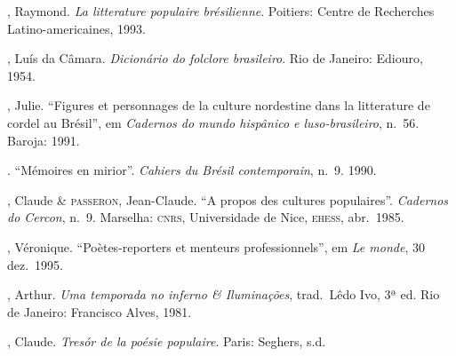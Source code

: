 \begin{bibliohedra}[]

, Raymond. \textit{La litterature populaire brésilienne}. 
Poitiers: Centre de Recherches Latino-americaines, 1993.

, Luís da Câmara. \textit{Dicionário do folclore
brasileiro}. Rio de Janeiro: Ediouro, 1954. 

, Julie. “Figures et personnages de la culture 
nordestine dans la litterature de cordel au Brésil”, 
em \textit{Cadernos do mundo hispânico e luso-brasileiro}, n.~56. 
Baroja: 1991.

\titidem. “Mémoires en mirior”. \textit{Cahiers du Brésil
contemporain}, n.~9. 1990.

, Claude \& \textsc{passeron}, Jean-Claude. “A propos 
des cultures populaires”. \textit{Cadernos do Cercon}, n.~9. 
Marselha: \textsc{cnrs}, Universidade de Nice, \textsc{ehess}, abr.~1985. 

, Véronique. “Poètes-reporters et menteurs
professionnels”, em \textit{Le monde}, 30 dez.~1995.

, Arthur. \textit{Uma temporada no inferno \&
Iluminações}, trad.~Lêdo Ivo, 3ª ed. Rio de Janeiro: Francisco Alves,
1981.

, Claude. \textit{Tresór de la poésie populaire}. Paris:
Seghers, s.d.

\end{bibliohedra}

